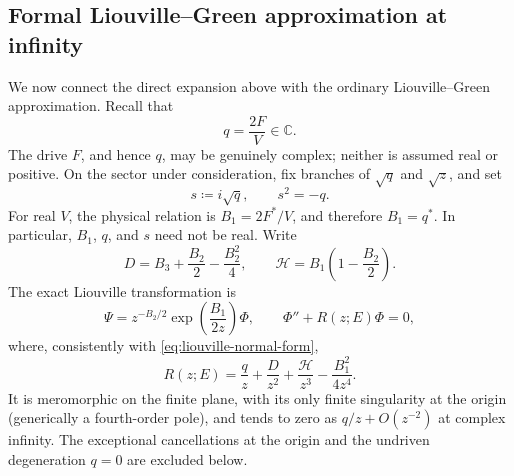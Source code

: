 \documentclass[11pt]{article}
\theoremstyle{remark}
\newcommand{\C}{\mathbb{C}}
\begin{document}
\subsection{Formal Liouville--Green approximation at infinity}
\label{subsec:formal-liouville-green}

We now connect the direct expansion above with the ordinary
Liouville--Green approximation.  Recall that
\begin{equation}
 q=\frac{2F}{V}\in\C.
 \label{eq:lg-q-definition}
\end{equation}
The drive \(F\), and hence \(q\), may be genuinely complex; neither is
assumed real or positive.  On the sector under consideration, fix branches
of \(\sqrt q\) and \(\sqrt z\), and set
\begin{equation}
 s\coloneqq i\sqrt q,
 \qquad s^2=-q.
 \label{eq:lg-s-definition}
\end{equation}
For real \(V\), the physical relation is
\(B_1=2F^*/V\), and therefore \(B_1=q^*\).  In particular, \(B_1\), \(q\),
and \(s\) need not be real.  Write
\begin{equation}
 D=B_3+\frac{B_2}{2}-\frac{B_2^2}{4},\qquad
 \mathcal{H}=B_1\left(1-\frac{B_2}{2}\right).
 \label{eq:lg-DH}
\end{equation}
The exact Liouville transformation is
\begin{equation}
 \Psi=z^{-B_2/2}\exp\!\left(\frac{B_1}{2z}\right)\Phi,
 \qquad
 \Phi''+R(z;E)\Phi=0,
 \end{equation}
where, consistently with \eqref{eq:liouville-normal-form},
\begin{equation}
 R(z;E)=\frac qz+\frac D{z^2}+\frac{\mathcal{H}}{z^3}
        -\frac{B_1^2}{4z^4}.
 \label{eq:lg-normal-form}
\end{equation}
It is meromorphic on the finite plane, with its only finite singularity at
the origin (generically a fourth-order pole), and tends to zero as
\(q/z+O(z^{-2})\) at complex infinity.  The exceptional cancellations at
the origin and the undriven degeneration \(q=0\) are excluded below.
\end{document}
